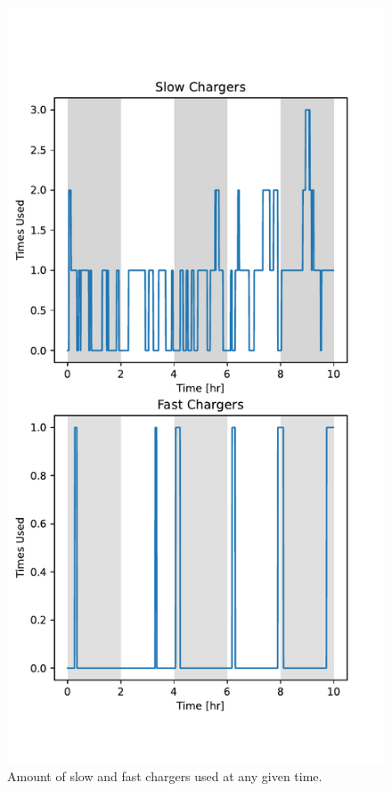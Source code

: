 \documentclass[letterpaper, 10pt, conference]{IEEEtran}
\begin{document}
\begin{figure}[ht]
	\centering
	\includegraphics[trim=0in 0in 0in 0in, width=\linewidth]{usage.pdf}
	\caption{Amount of slow and fast chargers used at any given time.}
	\label{fig:usage}
\end{figure}
\end{document}
